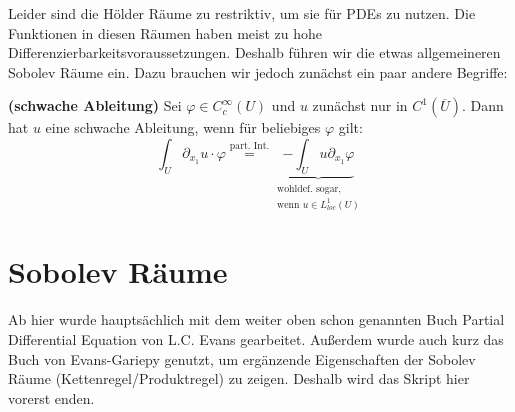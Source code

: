 Leider sind die Hölder Räume zu restriktiv, um sie für PDEs zu nutzen. Die Funktionen in diesen Räumen haben meist zu hohe Differenzierbarkeitsvoraussetzungen. Deshalb führen wir die etwas allgemeineren Sobolev Räume ein. Dazu brauchen wir jedoch zunächst ein paar andere Begriffe:

\begin{definition}\textbf{(schwache Ableitung)}\enter
	Sei $\varphi\in C^\infty_c(U)$ und $u$ zunächst nur in $C^1(\overline{U})$. Dann hat $u$ eine schwache Ableitung, wenn für beliebiges $\varphi$ gilt:
	\[\int_U\partial_{x_1}u\cdot \varphi \stackrel{\text{part. Int.}}{=}
	\underbrace{-\int_U u\partial_{x_1}\varphi}_{\substack{\text{wohldef. sogar,}\\\text{wenn } u\in L^1_{loc}(U)}}\]
\end{definition}

\section{Sobolev Räume}

Ab hier wurde hauptsächlich mit dem weiter oben schon genannten Buch \dq Partial Differential Equation\dq{} von L.C. Evans gearbeitet.
Außerdem wurde auch kurz das Buch von Evans-Gariepy genutzt, um ergänzende Eigenschaften der Sobolev Räume (Kettenregel/Produktregel) zu zeigen.
Deshalb wird das Skript hier vorerst enden.
